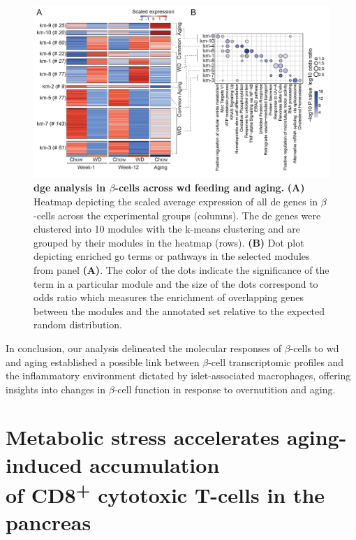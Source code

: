 \begin{figure}[t!]
    \centering
    \includegraphics[width=\linewidth]{Chapter4/Fig/F2-12-01.png}
    \caption[ analayis in $\beta$-cells across  feeding and aging]{\textbf{\gls{dge} analysis in $\beta$-cells across \gls{wd} feeding and aging.} \textbf{(A)} Heatmap depicting the scaled average expression of all \gls{de} genes in $\beta$-cells across the experimental groups (columns). The \gls{de} genes were clustered into 10 modules with the k-means clustering and are grouped by their modules in the heatmap (rows). \textbf{(B)} Dot plot depicting enriched \gls{go} terms or pathways in the selected modules from panel \textbf{(A)}. The color of the dots indicate the significance of the term in a particular module and the size of the dots correspond to odds ratio which measures the enrichment of overlapping genes between the modules and the annotated set relative to the expected random distribution. }
    \label{fig:chp2_scrna_betacells2}
\end{figure}

\par In conclusion, our analysis delineated the molecular responses of $\beta$-cells to \gls{wd} and aging established a possible link between $\beta$-cell transcriptomic profiles and the inflammatory environment dictated by islet-associated macrophages, offering insights into changes in $\beta$-cell function in response to overnutition and aging.





\section[Metabolic stress accelerates aging-induced accumulation of CD8\textsuperscript{+} cytotoxic T-cells in the pancreas]{Metabolic stress accelerates aging-induced accumulation\\of CD8\textsuperscript{+} cytotoxic T-cells in the pancreas}
\label{sec:sc_tcells}

